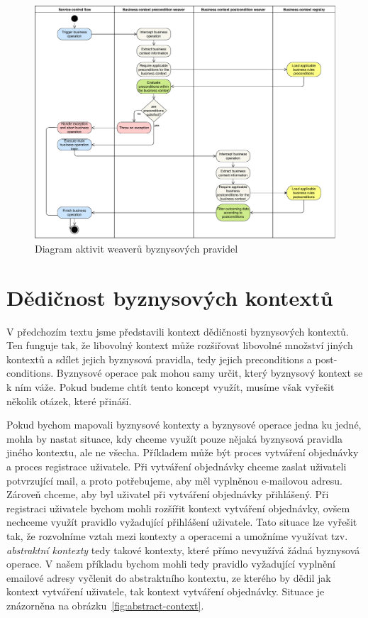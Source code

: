 \begin{figure}
    \centering
    \includegraphics[keepaspectratio=true, width=0.8\linewidth]{figures/business-rules-weaver.pdf}
    \caption{Diagram aktivit weaverů byznysov\'ych pravidel}
    \label{fig:business-rules-weaver}
\end{figure} %

\section{Dědičnost byznysových kontextů}\label{sec:context-inheritance}

V předchozím textu jsme představili kontext dědičnosti byznysových kontextů. Ten funguje tak,
že libovolný kontext může rozšiřovat libovolné množství jiných kontextů a sdílet jejich
byznysová pravidla, tedy jejich preconditions a post-conditions. Byznysové operace
pak mohou samy určit, který byznysový kontext se k ním váže. Pokud budeme chtít tento
koncept využít, musíme však vyřešit několik otázek, které přináší.

Pokud bychom mapovali byznysové kontexty a byznysové operace jedna ku jedné, mohla by
nastat situace, kdy chceme využít pouze nějaká byznysová pravidla jiného kontextu,
ale ne všecha. Příkladem může být proces vytváření objednávky a proces registrace uživatele.
Při vytváření objednávky chceme zaslat uživateli potvrzující mail, a proto potřebujeme, aby
měl vyplněnou e-mailovou adresu. Zároveň chceme, aby byl uživatel při vytváření objednávky přihlášený.
Při registraci uživatele bychom mohli rozšířit kontext vytváření objednávky, ovšem nechceme využít pravidlo
vyžadující přihlášení uživatele. Tato situace lze vyřešit tak, že rozvolníme vztah mezi kontexty a operacemi
a umožníme využívat tzv. \textit{abstraktní kontexty} \textendash\xspace tedy takové kontexty, které
přímo nevyužívá žádná byznysová operace. V našem příkladu bychom mohli tedy pravidlo vyžadující vyplnění
emailové adresy vyčlenit do abstraktního kontextu, ze kterého by dědil jak kontext vytváření uživatele,
tak kontext vytváření objednávky. Situace je znázorněna na obrázku~\ref{fig:abstract-context}.

